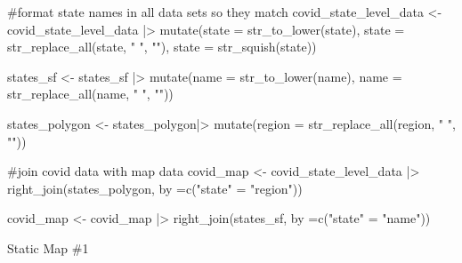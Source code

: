 \documentclass[
  letterpaper,
  DIV=11,
  numbers=noendperiod]{scrartcl}
\newenvironment{Shaded}{\begin{snugshade}}{\end{snugshade}}
\newcommand{\AttributeTok}[1]{\textcolor[rgb]{0.40,0.45,0.13}{#1}}
\newcommand{\CommentTok}[1]{\textcolor[rgb]{0.37,0.37,0.37}{#1}}
\newcommand{\FunctionTok}[1]{\textcolor[rgb]{0.28,0.35,0.67}{#1}}
\newcommand{\NormalTok}[1]{\textcolor[rgb]{0.00,0.23,0.31}{#1}}
\newcommand{\OtherTok}[1]{\textcolor[rgb]{0.00,0.23,0.31}{#1}}
\newcommand{\SpecialCharTok}[1]{\textcolor[rgb]{0.37,0.37,0.37}{#1}}
\newcommand{\StringTok}[1]{\textcolor[rgb]{0.13,0.47,0.30}{#1}}
\begin{document}
\begin{Shaded}
\begin{Highlighting}[]
\CommentTok{\#format state names in all data sets so they match }
\NormalTok{covid\_state\_level\_data }\OtherTok{\textless{}{-}}\NormalTok{ covid\_state\_level\_data }\SpecialCharTok{|\textgreater{}}
  \FunctionTok{mutate}\NormalTok{(}\AttributeTok{state =} \FunctionTok{str\_to\_lower}\NormalTok{(state),}
         \AttributeTok{state =} \FunctionTok{str\_replace\_all}\NormalTok{(state, }\StringTok{" "}\NormalTok{, }\StringTok{""}\NormalTok{),}
         \AttributeTok{state =} \FunctionTok{str\_squish}\NormalTok{(state))}

\NormalTok{states\_sf }\OtherTok{\textless{}{-}}\NormalTok{ states\_sf }\SpecialCharTok{|\textgreater{}}
  \FunctionTok{mutate}\NormalTok{(}\AttributeTok{name =} \FunctionTok{str\_to\_lower}\NormalTok{(name),}
         \AttributeTok{name =} \FunctionTok{str\_replace\_all}\NormalTok{(name, }\StringTok{" "}\NormalTok{, }\StringTok{""}\NormalTok{))}

\NormalTok{states\_polygon }\OtherTok{\textless{}{-}}\NormalTok{ states\_polygon}\SpecialCharTok{|\textgreater{}}
  \FunctionTok{mutate}\NormalTok{(}\AttributeTok{region =} \FunctionTok{str\_replace\_all}\NormalTok{(region, }\StringTok{" "}\NormalTok{, }\StringTok{""}\NormalTok{))}
\end{Highlighting}
\end{Shaded}

\begin{Shaded}
\begin{Highlighting}[]
\CommentTok{\#join covid data with map data}
\NormalTok{covid\_map }\OtherTok{\textless{}{-}}\NormalTok{ covid\_state\_level\_data }\SpecialCharTok{|\textgreater{}}
  \FunctionTok{right\_join}\NormalTok{(states\_polygon, }\AttributeTok{by =}\FunctionTok{c}\NormalTok{(}\StringTok{"state"} \OtherTok{=} \StringTok{"region"}\NormalTok{))}

\NormalTok{covid\_map }\OtherTok{\textless{}{-}}\NormalTok{ covid\_map }\SpecialCharTok{|\textgreater{}}
  \FunctionTok{right\_join}\NormalTok{(states\_sf, }\AttributeTok{by =}\FunctionTok{c}\NormalTok{(}\StringTok{"state"} \OtherTok{=} \StringTok{"name"}\NormalTok{))}
\end{Highlighting}
\end{Shaded}

Static Map \#1
\end{document}
